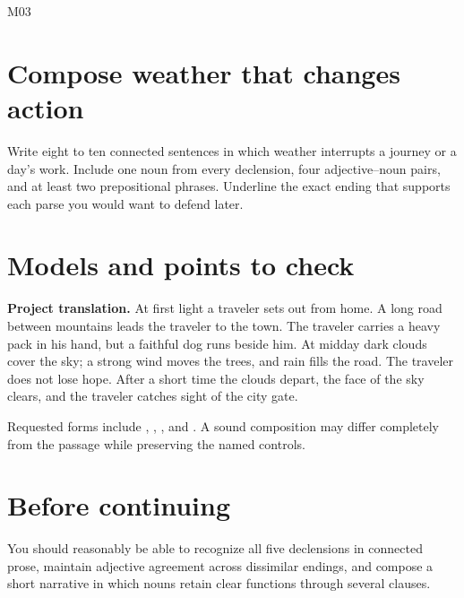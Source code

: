 \begin{courseunit}{M03}
\section{Compose weather that changes action}

Write eight to ten connected sentences in which weather interrupts a journey
or a day's work.  Include one noun from every declension, four adjective--noun
pairs, and at least two prepositional phrases.  Underline the exact ending that
supports each parse you would want to defend later.

\ifsolutions
\section{Models and points to check}

\textbf{Project translation.} At first light a traveler sets out from home. A
long road between mountains leads the traveler to the town. The traveler carries a heavy
pack in his hand, but a faithful dog runs beside him. At midday dark clouds
cover the sky; a strong wind moves the trees, and rain fills the road. The
traveler does not lose hope. After a short time the clouds depart, the face of
the sky clears, and the traveler catches sight of the city gate.

Requested forms include , ,
, and .  A sound composition
may differ completely from the passage while preserving the named controls.
\else
\section{Before continuing}

You should reasonably be able to recognize all five declensions in connected
prose, maintain adjective agreement across dissimilar endings, and compose a
short narrative in which nouns retain clear functions through several clauses.
\fi
\end{courseunit}

